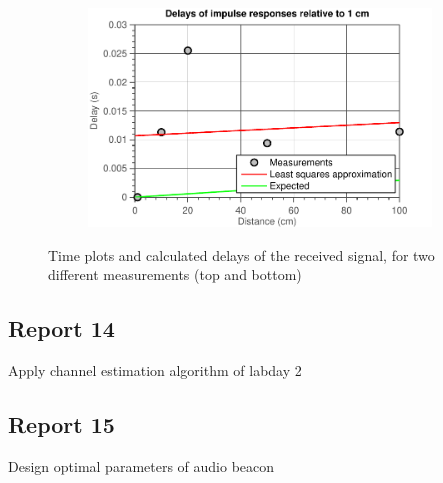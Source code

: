 \documentclass[11pt,titlepage]{report}
\begin{document}
\begin{figure}[H]
\begin{subfigure}{0.49\textwidth}
	\end{subfigure}
	\begin{subfigure}{0.49\textwidth}
		\includegraphics[width=\textwidth]{../../deliverable-7-resources/figures/ass-1/report-11-12-13/ass-1-report-13-delays-set-2.pdf}
	\end{subfigure}
	\caption{Time plots and calculated delays of the received signal, for two different measurements (top and bottom)}
	\label{fig:rep12-los}
\end{figure}


\subsection{Report 14}
Apply channel estimation algorithm of labday 2

\subsection{Report 15}
Design optimal parameters of audio beacon
\end{document}

